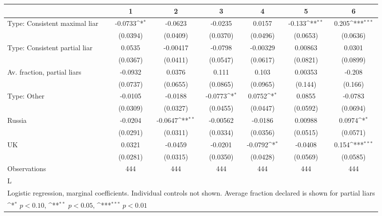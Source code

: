 {
\def\sym#1{\ifmmode^{#1}\else\(^{#1}\)\fi}
\begin{tabular}{l*{6}{c}}
\hline\hline
                &\multicolumn{1}{c}{1}&\multicolumn{1}{c}{2}&\multicolumn{1}{c}{3}&\multicolumn{1}{c}{4}&\multicolumn{1}{c}{5}&\multicolumn{1}{c}{6}\\
\hline
Type: Consistent maximal liar&  -0.0733\sym{*}  &  -0.0623         &  -0.0235         &   0.0157         &   -0.133\sym{**} &    0.205\sym{***}\\
                & (0.0394)         & (0.0409)         & (0.0370)         & (0.0496)         & (0.0653)         & (0.0636)         \\
Type: Consistent partial liar&   0.0535         & -0.00417         &  -0.0798         & -0.00329         &  0.00863         &   0.0301         \\
                & (0.0367)         & (0.0411)         & (0.0547)         & (0.0617)         & (0.0821)         & (0.0899)         \\
Av. fraction, partial liars&  -0.0932         &   0.0376         &    0.111         &    0.103         &  0.00353         &   -0.208         \\
                & (0.0737)         & (0.0655)         & (0.0865)         & (0.0965)         &  (0.144)         &  (0.166)         \\
Type: Other     &  -0.0105         &  -0.0188         &  -0.0773\sym{*}  &   0.0752\sym{*}  &   0.0855         &  -0.0783         \\
                & (0.0309)         & (0.0327)         & (0.0455)         & (0.0447)         & (0.0592)         & (0.0694)         \\
Russia          &  -0.0204         &  -0.0647\sym{**} & -0.00562         &  -0.0186         &  0.00988         &   0.0974\sym{*}  \\
                & (0.0291)         & (0.0311)         & (0.0334)         & (0.0356)         & (0.0515)         & (0.0571)         \\
UK              &   0.0321         &  -0.0459         &  -0.0201         &  -0.0792\sym{*}  &  -0.0408         &    0.154\sym{***}\\
                & (0.0281)         & (0.0315)         & (0.0350)         & (0.0428)         & (0.0569)         & (0.0585)         \\
\hline
Observations    &      444         &      444         &      444         &      444         &      444         &      444         \\
L               &                  &                  &                  &                  &                  &                  \\
\hline\hline
\multicolumn{7}{l}{\footnotesize Logistic regression, marginal coefficients. Individual controls not shown. Average fraction declared is shown for partial liars}\\
\multicolumn{7}{l}{\footnotesize \sym{*} \(p<0.10\), \sym{**} \(p<0.05\), \sym{***} \(p<0.01\)}\\
\end{tabular}
}
